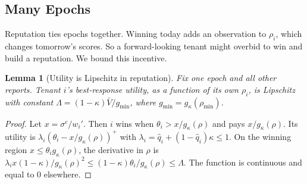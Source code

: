 \documentclass[journal]{IEEEtran}
\newtheorem{lemma}{Lemma}
\theoremstyle{remark}
\begin{document}
\subsection{Many Epochs}
Reputation ties epochs together. Winning today adds an observation to $\rho_i$, which changes tomorrow's scores. So a forward-looking tenant might overbid to win and build a reputation. We bound this incentive.

\begin{lemma}[Utility is Lipschitz in reputation]\label{lem:lip}
Fix one epoch and all other reports. Tenant $i$'s best-response utility, as a function of its own $\rho_i$, is Lipschitz with constant $\Lambda=(1-\kappa)\bar V/g_{\min}$, where $g_{\min}=g_\kappa(\rho_{\min})$.
\end{lemma}
\begin{proof}
Let $x=\sigma^c/w_i'$. Then $i$ wins when $\theta_i>x/g_\kappa(\rho)$ and pays $x/g_\kappa(\rho)$. Its utility is $\lambda_i(\theta_i-x/g_\kappa(\rho))^+$ with $\lambda_i=\hat q_i+(1-\hat q_i)\kappa\le1$. On the winning region $x\le\theta_ig_\kappa(\rho)$, the derivative in $\rho$ is $\lambda_ix(1-\kappa)/g_\kappa(\rho)^2\le(1-\kappa)\theta_i/g_\kappa(\rho)\le\Lambda$. The function is continuous and equal to $0$ elsewhere.
\end{proof}
\end{document}
